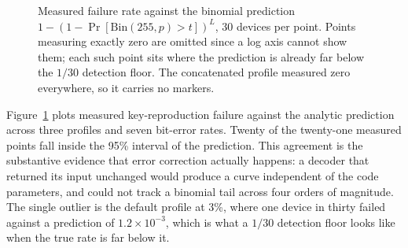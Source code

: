 \documentclass[conference]{IEEEtran}
\begin{document}
\begin{figure}[H]
\centering
{}
\caption{Measured failure rate against the binomial prediction
$1-(1-\Pr[\mathrm{Bin}(255,p)>t])^{L}$, 30 devices per point. Points measuring
exactly zero are omitted since a log axis cannot show them; each such point sits
where the prediction is already far below the $1/30$ detection floor. The
concatenated profile measured zero everywhere, so it carries no markers.}
\label{fig:rel}
\end{figure}

Figure~\ref{fig:rel} plots measured key-reproduction failure against the
analytic prediction across three profiles and seven bit-error rates. Twenty of
the twenty-one measured points fall inside the 95\% interval of the prediction.
This agreement is the substantive evidence that error correction actually
happens: a decoder that returned its input unchanged would produce a curve
independent of the code parameters, and could not track a binomial tail across
four orders of magnitude. The single outlier is the default profile at 3\%,
where one device in thirty failed against a prediction of $1.2 \times 10^{-3}$,
which is what a $1/30$ detection floor looks like when the true rate is far
below it.
\end{document}
